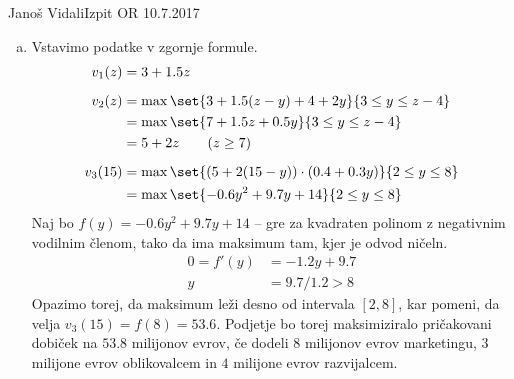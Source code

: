 \begin{naloga}{Janoš Vidali}{Izpit OR 10.7.2017}
\begin{odgovor}
\begin{enumerate}[(a)]
\item Vstavimo podatke v zgornje formule.
\begin{align*}
v_1(z)  &= 3 + 1.5 z \\[2mm]
v_2(z)  &= \max\set{3 + 1.5 (z-y) + 4 + 2y}{3 \le y \le z - 4} \\
        &= \max\set{7 + 1.5 z + 0.5 y}{3 \le y \le z - 4} \\
        &= 5 + 2z \qquad (z \ge 7) \\[2mm]
v_3(15) &= \max\set{(5 + 2(15-y)) \cdot (0.4 + 0.3 y)}{2 \le y \le 8} \\
        &= \max\set{-0.6 y^2 + 9.7 y + 14}{2 \le y \le 8}
\end{align*}
Naj bo $f(y) = -0.6 y^2 + 9.7 y + 14$
-- gre za kvadraten polinom z negativnim vodilnim členom,
tako da ima maksimum tam, kjer je odvod ničeln.
\begin{align*}
0 = f'(y) &= -1.2 y + 9.7 \\
y &= 9.7/1.2 > 8
\end{align*}
Opazimo torej, da maksimum leži desno od intervala $[2, 8]$,
kar pomeni, da velja $v_3(15) = f(8) = 53.6$.
Podjetje bo torej maksimiziralo pričakovani dobiček na $53.8$ milijonov evrov,
če dodeli $8$ milijonov evrov marketingu,
$3$ milijone evrov oblikovalcem in $4$ milijone evrov razvijalcem.
\end{enumerate}
\end{odgovor}
\end{naloga}
